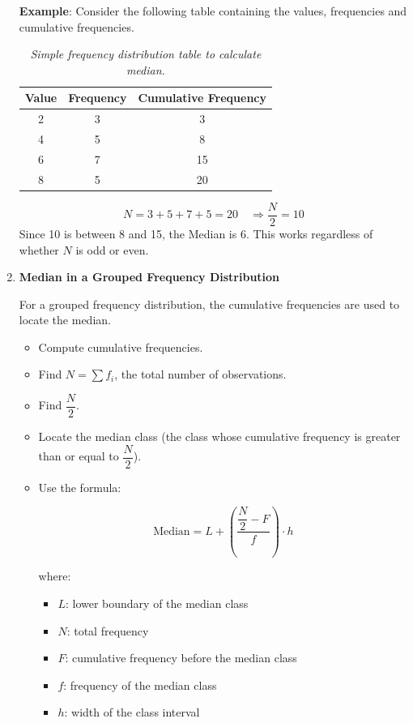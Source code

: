 \documentclass[twoside]{book}
\begin{document}
\begin{enumerate}
\textbf{Example}: Consider the following table containing the values, frequencies and cumulative frequencies.

\begin{table}[H]
\begin{center}
	\begin{tabular}{c|c|c}
		\toprule
		\textbf{Value} & \textbf{Frequency} & \textbf{Cumulative Frequency}\\
		\midrule
		2 & 3 & 3\\
		4 & 5 & 8\\
		6 & 7 & 15\\
		8 & 5 & 20\\
		\bottomrule
	\end{tabular}
\end{center}
\caption{\textit{Simple frequency distribution table to calculate median.}}
\end{table}


\[
N = 3 + 5 + 7 + 5 = 20 \quad \Rightarrow \dfrac{N}{2} = 10
\]
Since 10 is between 8 and 15, the Median is 6. This works regardless of whether $N$ is odd or even.

\item \textbf{Median in a Grouped Frequency Distribution}

For a grouped frequency distribution, the cumulative frequencies are used to locate the median.

\begin{itemize}
    \item Compute cumulative frequencies.
    \item Find \( N = \sum f_i \), the total number of observations.
    \item Find \( \dfrac{N}{2} \).
    \item Locate the median class (the class whose cumulative frequency is greater than or equal to \( \dfrac{N}{2} \)).
    \item Use the formula:
    \begin{textbox}
    \[
    \text{Median} = L + \left( \dfrac{\dfrac{N}{2} - F}{f} \right) \cdot h
    \]
    \end{textbox}
    where:
    \begin{itemize}
        \item \( L \): lower boundary of the median class
        \item \( N \): total frequency
        \item \( F \): cumulative frequency before the median class
        \item \( f \): frequency of the median class
        \item \( h \): width of the class interval
    \end{itemize}
\end{itemize}


\end{enumerate}
\end{document}
